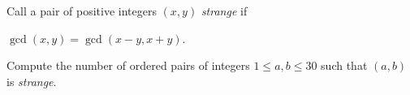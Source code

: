 Call a pair of positive integers $(x, y)$ \emph{strange} if

$\gcd(x, y) = \gcd(x-y, x + y).$

Compute the number of ordered pairs of integers $1 \le a, b \le 30$ such that $(a, b)$ is \emph{strange}.
